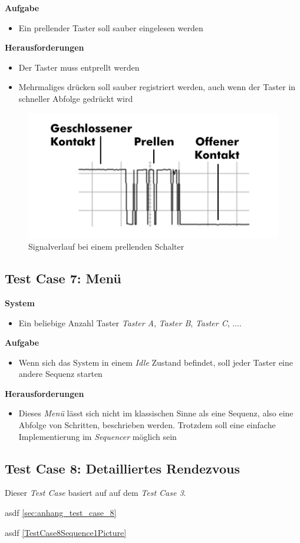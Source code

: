 \textbf{Aufgabe}
\begin{itemize}
\item Ein prellender Taster soll sauber eingelesen werden
\end{itemize}

\textbf{Herausforderungen}
\begin{itemize}
\item Der Taster muss entprellt werden
\item Mehrmaliges drücken soll sauber registriert werden, auch wenn der Taster in schneller Abfolge gedrückt wird
\end{itemize}

\begin{figure}[]
\centering
\includegraphics[angle=0]{images/Testcase06.png}
\caption{Signalverlauf bei einem prellenden Schalter}
\label{Testcase06Picture}
\end{figure}


\subsection{Test Case 7: Menü}
\textbf{System}
\begin{itemize}
\item Ein beliebige Anzahl Taster \textit{Taster A}, \textit{Taster B}, \textit{Taster C}, ....
\end{itemize}

\textbf{Aufgabe}
\begin{itemize}
\item Wenn sich das System in einem \textit{Idle} Zustand befindet, soll jeder Taster eine andere Sequenz starten
\end{itemize}

\textbf{Herausforderungen}
\begin{itemize}
\item Dieses \textit{Menü} lässt sich nicht im klassischen Sinne als eine Sequenz, also eine Abfolge von Schritten, beschrieben werden. Trotzdem soll eine einfache Implementierung im \textit{Sequencer} möglich sein
\end{itemize}


\subsection{Test Case 8: Detailliertes Rendezvous}
Dieser \textit{Test Case} basiert auf auf dem \textit{Test Case 3}.

asdf \ref{sec:anhang_test_case_8}

asdf \ref{TestCase8Sequence1Picture}
